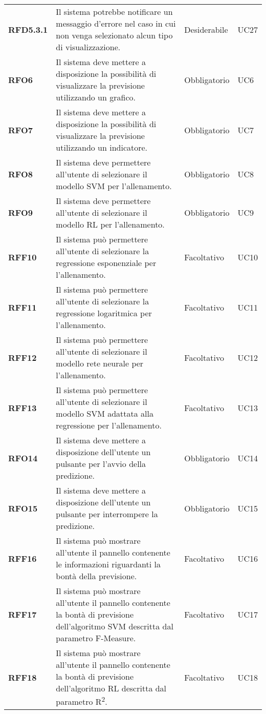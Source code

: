 \begin{longtable}[H]{>{\centering\bfseries}m{2cm} >{\centering}m{9cm} >{\centering}m{2.5cm} >{\centering\arraybackslash}m{2.5cm}}
  \textbf{RFD5.3.1} & Il sistema potrebbe notificare un messaggio d'errore nel caso in cui non venga selezionato alcun tipo di visualizzazione. & Desiderabile & UC27 \\
  \textbf{RFO6} & Il sistema deve mettere a disposizione la possibilità di visualizzare la previsione utilizzando un grafico. & Obbligatorio & UC6 \\
  \textbf{RFO7} & Il sistema deve mettere a disposizione la possibilità di visualizzare la previsione utilizzando un indicatore. & Obbligatorio & UC7 \\
  \textbf{RFO8} & Il sistema deve permettere all'utente di selezionare il modello SVM per l'allenamento. & Obbligatorio & UC8 \\
  \textbf{RFO9} & Il sistema deve permettere all'utente di selezionare il modello RL per l'allenamento. & Obbligatorio & UC9 \\
  \textbf{RFF10} & Il sistema può permettere all'utente di selezionare la regressione esponenziale per l'allenamento. & Facoltativo & UC10 \\
  \textbf{RFF11} & Il sistema può permettere all'utente di selezionare la regressione logaritmica per l'allenamento. & Facoltativo & UC11 \\
  \textbf{RFF12} & Il sistema può permettere all'utente di selezionare il modello rete neurale per l'allenamento. & Facoltativo & UC12 \\
  \textbf{RFF13} & Il sistema può permettere all'utente di selezionare il modello SVM adattata alla regressione per l'allenamento. & Facoltativo & UC13 \\
  \textbf{RFO14} & Il sistema deve mettere a disposizione dell’utente un pulsante per l’avvio della predizione. & Obbligatorio & UC14 \\
  \textbf{RFO15} & Il sistema deve mettere a disposizione dell’utente un pulsante per interrompere la predizione. & Obbligatorio & UC15 \\
  \textbf{RFF16} & Il sistema può mostrare all'utente il pannello contenente le informazioni riguardanti la bontà della previsione. & Facoltativo & UC16 \\
  \textbf{RFF17} & Il sistema può mostrare all'utente il pannello contenente la bontà di previsione dell'algoritmo SVM descritta dal parametro F-Measure. & Facoltativo & UC17 \\
  \textbf{RFF18} & Il sistema può mostrare all'utente il pannello contenente la bontà di previsione dell'algoritmo RL descritta dal parametro R\textsuperscript{2}. & Facoltativo & UC18 \\

\end{longtable}
